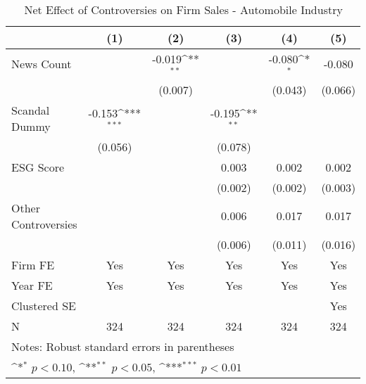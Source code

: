 \begin{table}[htbp]\centering
\def\sym#1{\ifmmode^{#1}\else\(^{#1}\)\fi}
\caption{Net Effect of Controversies on Firm Sales - Automobile Industry}
\begin{tabular}{l*{5}{c}}
\toprule
                    &\multicolumn{1}{c}{(1)}         &\multicolumn{1}{c}{(2)}         &\multicolumn{1}{c}{(3)}         &\multicolumn{1}{c}{(4)}         &\multicolumn{1}{c}{(5)}         \\
\midrule
News Count          &                     &      -0.019\sym{**} &                     &      -0.080\sym{*}  &      -0.080         \\
                    &                     &     (0.007)         &                     &     (0.043)         &     (0.066)         \\
\addlinespace
Scandal Dummy       &      -0.153\sym{***}&                     &      -0.195\sym{**} &                     &                     \\
                    &     (0.056)         &                     &     (0.078)         &                     &                     \\
\addlinespace
ESG Score           &                     &                     &       0.003         &       0.002         &       0.002         \\
                    &                     &                     &     (0.002)         &     (0.002)         &     (0.003)         \\
\addlinespace
Other Controversies &                     &                     &       0.006         &       0.017         &       0.017         \\
                    &                     &                     &     (0.006)         &     (0.011)         &     (0.016)         \\
\midrule
Firm FE             &         Yes         &         Yes         &         Yes         &         Yes         &         Yes         \\
Year FE             &         Yes         &         Yes         &         Yes         &         Yes         &         Yes         \\
Clustered SE        &                     &                     &                     &                     &         Yes         \\
N                   &         324         &         324         &         324         &         324         &         324         \\
\bottomrule
\multicolumn{6}{l}{\footnotesize Notes: Robust standard errors in parentheses}\\
\multicolumn{6}{l}{\footnotesize \sym{*} \(p<0.10\), \sym{**} \(p<0.05\), \sym{***} \(p<0.01\)}\\
\end{tabular}
\end{table}
